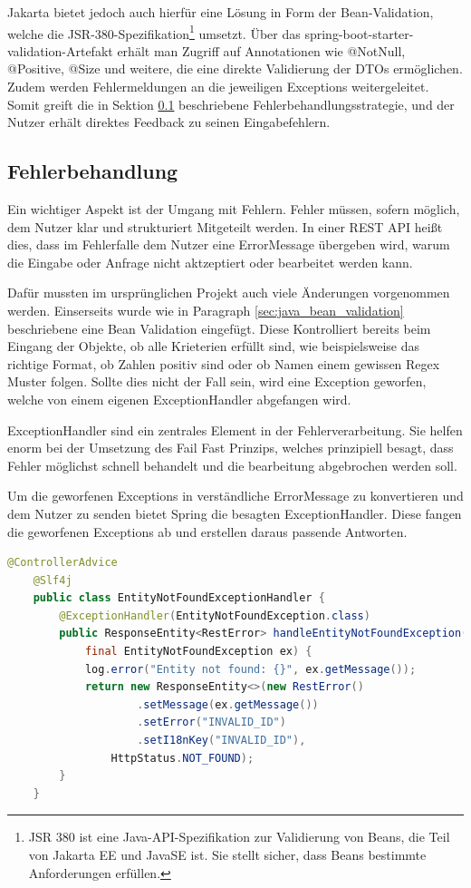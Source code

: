Jakarta bietet jedoch auch hierfür eine Lösung in Form der Bean-Validation, welche die JSR-380-Spezifikation\footnote{JSR 380 ist eine Java-API-Spezifikation zur Validierung von Beans, die Teil von Jakarta EE und JavaSE ist. 
Sie stellt sicher, dass Beans bestimmte Anforderungen erfüllen.} umsetzt. Über das spring-boot-starter-validation-Artefakt erhält man Zugriff auf Annotationen wie @NotNull, @Positive, @Size und weitere, die eine direkte Validierung der DTOs ermöglichen. 
Zudem werden Fehlermeldungen an die jeweiligen Exceptions weitergeleitet. Somit greift die in Sektion \ref{sec:java_error_handling} beschriebene Fehlerbehandlungsstrategie, und der Nutzer erhält direktes Feedback zu seinen Eingabefehlern.


\subsection{Fehlerbehandlung}
\label{sec:java_error_handling}
Ein wichtiger Aspekt ist der Umgang mit Fehlern. Fehler müssen, sofern möglich, dem Nutzer klar und strukturiert Mitgeteilt werden.
In einer REST API heißt dies, dass im Fehlerfalle dem Nutzer eine ErrorMessage übergeben wird, warum die Eingabe oder Anfrage nicht aktzeptiert oder bearbeitet werden kann.

Dafür mussten im ursprünglichen Projekt auch viele Änderungen vorgenommen werden. Einserseits wurde wie in Paragraph \ref{sec:java_bean_validation} beschriebene eine Bean Validation eingefügt.
Diese Kontrolliert bereits beim Eingang der Objekte, ob alle Krieterien erfüllt sind, wie beispielsweise das richtige Format, ob Zahlen positiv sind oder ob Namen einem gewissen Regex Muster folgen.
Sollte dies nicht der Fall sein, wird eine Exception geworfen, welche von einem eigenen ExceptionHandler abgefangen wird.

ExceptionHandler sind ein zentrales Element in der Fehlerverarbeitung.
Sie helfen enorm bei der Umsetzung des Fail Fast Prinzips\cite{fail_fast:online}, welches prinzipiell besagt, dass Fehler möglichst schnell behandelt und die bearbeitung abgebrochen werden soll.

Um die geworfenen Exceptions in verständliche ErrorMessage zu konvertieren und dem Nutzer zu senden bietet Spring die besagten ExceptionHandler. Diese fangen die geworfenen Exceptions ab und erstellen daraus passende Antworten.


\begin{lstlisting}[language=Java, caption={Error Handling für den Fall, dass Ids nicht gefunden werden}, label={code:javaErrorHandling}]
    @ControllerAdvice
    @Slf4j
    public class EntityNotFoundExceptionHandler {
        @ExceptionHandler(EntityNotFoundException.class)
        public ResponseEntity<RestError> handleEntityNotFoundException(
            final EntityNotFoundException ex) {
            log.error("Entity not found: {}", ex.getMessage());
            return new ResponseEntity<>(new RestError()
                    .setMessage(ex.getMessage())
                    .setError("INVALID_ID") 
                    .setI18nKey("INVALID_ID"),
                HttpStatus.NOT_FOUND);
        }
    }
\end{lstlisting}

